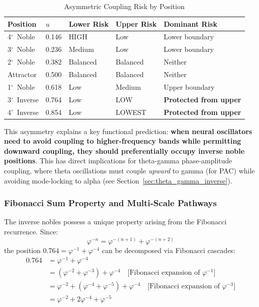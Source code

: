 \documentclass[11pt,a4paper]{article}
\newcommand{\degree}{$^\circ$}  %
\newcommand{\phisym}{\varphi}
\begin{document}
\begin{table}[H]
\centering
\caption{Asymmetric Coupling Risk by Position}
\label{tab:coupling_risk}
\begin{tabular}{@{}lllll@{}}
\toprule
Position & $u$ & Lower Risk & Upper Risk & Dominant Risk \\
\midrule
4\degree\ Noble & 0.146 & HIGH & Low & Lower boundary \\
3\degree\ Noble & 0.236 & Medium & Low & Lower boundary \\
2\degree\ Noble & 0.382 & Balanced & Balanced & Neither \\
Attractor & 0.500 & Balanced & Balanced & Neither \\
1\degree\ Noble & 0.618 & Low & Medium & Upper boundary \\
3\degree\ Inverse & 0.764 & Low & LOW & \textbf{Protected from upper} \\
4\degree\ Inverse & 0.854 & Low & LOWEST & \textbf{Protected from upper} \\
\bottomrule
\end{tabular}
\end{table}

This asymmetry explains a key functional prediction: \textbf{when neural oscillators need to avoid coupling to higher-frequency bands while permitting downward coupling, they should preferentially occupy inverse noble positions}. This has direct implications for theta-gamma phase-amplitude coupling, where theta oscillations must couple \textit{upward} to gamma (for PAC) while avoiding mode-locking to alpha (see Section~\ref{sec:theta_gamma_inverse}).

\subsubsection{Fibonacci Sum Property and Multi-Scale Pathways}
\label{sec:fibonacci_pathways}

The inverse nobles possess a unique property arising from the Fibonacci recurrence. Since:
\begin{equation}
\phisym^{-n} = \phisym^{-(n+1)} + \phisym^{-(n+2)}
\end{equation}
the position $0.764 = \phisym^{-1} + \phisym^{-4}$ can be decomposed via Fibonacci cascades:
\begin{align}
0.764 &= \phisym^{-1} + \phisym^{-4} \\
      &= (\phisym^{-2} + \phisym^{-3}) + \phisym^{-4} \quad \text{[Fibonacci expansion of $\phisym^{-1}$]} \\
      &= \phisym^{-2} + (\phisym^{-4} + \phisym^{-5}) + \phisym^{-4} \quad \text{[Fibonacci expansion of $\phisym^{-3}$]} \\
      &= \phisym^{-2} + 2\phisym^{-4} + \phisym^{-5}
\end{align}
\end{document}
